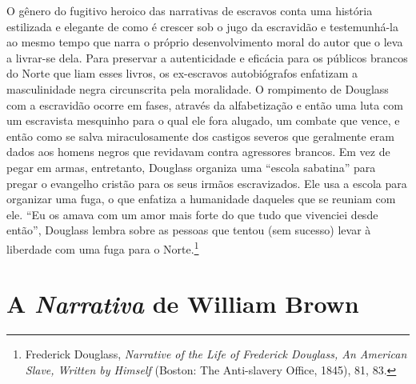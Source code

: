 O gênero do fugitivo heroico das narrativas de escravos conta uma
história estilizada e elegante de como é crescer sob o jugo da
escravidão e testemunhá-la ao mesmo tempo que narra o próprio
desenvolvimento moral do autor que o leva a livrar-se dela. Para
preservar a autenticidade e eficácia para os públicos brancos do Norte
que liam esses livros, os ex-escravos autobiógrafos enfatizam a
masculinidade negra circunscrita pela moralidade. O rompimento de
Douglass com a escravidão ocorre em fases, através da alfabetização e
então uma luta com um escravista mesquinho para o qual ele fora alugado,
um combate que vence, e então como se salva miraculosamente dos castigos
severos que geralmente eram dados aos homens negros que revidavam contra
agressores brancos. Em vez de pegar em armas, entretanto, Douglass
organiza uma ``escola sabatina'' para pregar o evangelho cristão para os
seus irmãos escravizados. Ele usa a escola para organizar uma fuga, o
que enfatiza a humanidade daqueles que se reuniam com ele. ``Eu os amava
com um amor mais forte do que tudo que vivenciei desde então'', Douglass
lembra sobre as pessoas que tentou (sem sucesso) levar à liberdade com
uma fuga para o Norte.\footnote{Frederick Douglass, \emph{Narrative of
  the Life of Frederick Douglass, An American Slave, Written by Himself}
  (Boston: The Anti-slavery Office, 1845), 81, 83.}

\section{}\label{section-2}

\section{\texorpdfstring{A \emph{Narrativa} de William
Brown}{A Narrativa de William Brown}}\label{a-narrativa-de-william-brown}

